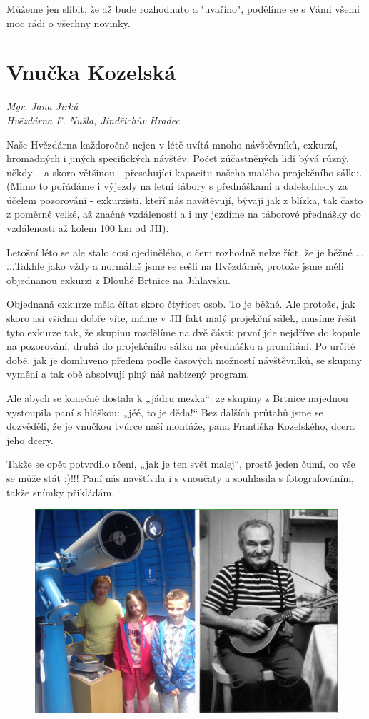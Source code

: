 \documentclass[10pt,a5paper,twoside]{book}
\newcommand{\autor}[1]{
	\begin{flushright}
	\textit{#1}
	\end{flushright}
}
\begin{document}
Můžeme jen slíbit, že až bude rozhodnuto a "uvaříno", podělíme se s Vámi všemi moc rádi o všechny novinky.
	
\section*{Vnučka Kozelská}
\autor{Mgr. Jana Jirků \\ Hvězdárna F. Nušla, Jindřichův Hradec}
Naše Hvězdárna každoročně nejen v létě uvítá mnoho návštěvníků, exkurzí, hromadných i jiných specifických návštěv. Počet zúčastněných lidí bývá různý, někdy – a skoro většinou - přesahující kapacitu našeho malého projekčního sálku. (Mimo to pořádáme i výjezdy na letní tábory s přednáškami a dalekohledy za účelem pozorování -  exkurzisti, kteří nás navštěvují, bývají jak z blízka, tak  často z poměrně velké, až značné vzdálenosti a i my jezdíme na táborové přednášky do vzdálenosti až kolem 100 km od JH). 

Letošní léto se ale stalo cosi ojedinělého, o čem rozhodně nelze říct, že je běžné ...
...Takhle jako vždy a normálně jsme se sešli na Hvězdárně, protože jsme měli objednanou exkurzi z Dlouhé Brtnice na Jihlavsku. 

Objednaná exkurze měla čítat skoro čtyřicet osob. To je běžné. Ale protože, jak skoro asi všichni dobře víte, máme v JH fakt malý projekční sálek, musíme řešit tyto exkurze tak, že skupinu rozdělíme na dvě části: první jde nejdříve do kopule na pozorování, druhá do projekčního sálku na přednášku a promítání. Po určité době, jak je domluveno předem podle časových možností návštěvníků, se skupiny vymění a tak obě absolvují  plný náš nabízený program.

Ale abych se konečně dostala k „jádru mezka“: ze skupiny z Brtnice najednou vystoupila paní s hláškou: „jéé, to je děda!“ Bez dalších průtahů jsme se dozvěděli, že je vnučkou tvůrce naší montáže, pana Františka Kozelského, dcera jeho dcery. 

Takže se opět potvrdilo rčení, „jak je ten svět malej“, prostě jeden čumí, co vše se může stát :)!!! Paní  nás navštívila i s vnoučaty a souhlasila s fotografováním, takže snímky přikládám.

\begin{figure}[!htbp]
	\begin{center}
  		\includegraphics*[width=11.5cm]{kozelsti.jpg}
  	\end{center}
\end{figure}
\end{document}
